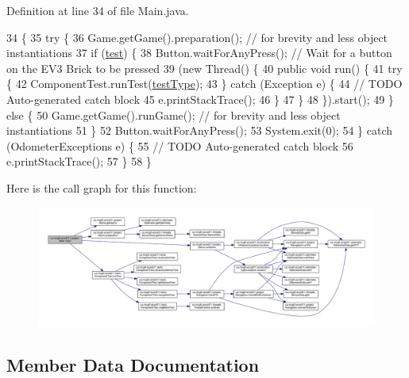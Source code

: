 Definition at line 34 of file Main.\+java.


\begin{DoxyCode}
34                                          \{
35     \textcolor{keywordflow}{try} \{
36       Game.getGame().preparation(); \textcolor{comment}{// for brevity and less object instantiations}
37       \textcolor{keywordflow}{if} (\hyperlink{classca_1_1mcgill_1_1ecse211_1_1project_1_1_main_af6f7b8fffddcf855f74fe128d2e23ea1}{test}) \{
38         Button.waitForAnyPress(); \textcolor{comment}{// Wait for a button on the EV3 Brick to be pressed}
39         (\textcolor{keyword}{new} Thread() \{
40           \textcolor{keyword}{public} \textcolor{keywordtype}{void} run() \{
41             \textcolor{keywordflow}{try} \{
42               ComponentTest.runTest(\hyperlink{classca_1_1mcgill_1_1ecse211_1_1project_1_1_main_a8dac740460370f76ac0db5dc20824b1f}{testType});
43             \} \textcolor{keywordflow}{catch} (Exception e) \{
44               \textcolor{comment}{// TODO Auto-generated catch block}
45               e.printStackTrace();
46             \}
47           \}
48         \}).start();
49       \} \textcolor{keywordflow}{else} \{
50         Game.getGame().runGame(); \textcolor{comment}{// for brevity and less object instantiations}
51       \}
52       Button.waitForAnyPress();
53       System.exit(0);
54     \} \textcolor{keywordflow}{catch} (OdometerExceptions e) \{
55       \textcolor{comment}{// TODO Auto-generated catch block}
56       e.printStackTrace();
57     \}
58   \}
\end{DoxyCode}
Here is the call graph for this function\+:
\nopagebreak
\begin{figure}[H]
\begin{center}
\leavevmode
\includegraphics[width=350pt]{classca_1_1mcgill_1_1ecse211_1_1project_1_1_main_af681b5dc675c13ed284071cc135f5fd3_cgraph}
\end{center}
\end{figure}


\subsection{Member Data Documentation}
\mbox{\label{classca_1_1mcgill_1_1ecse211_1_1project_1_1_main_af6f7b8fffddcf855f74fe128d2e23ea1}} 
